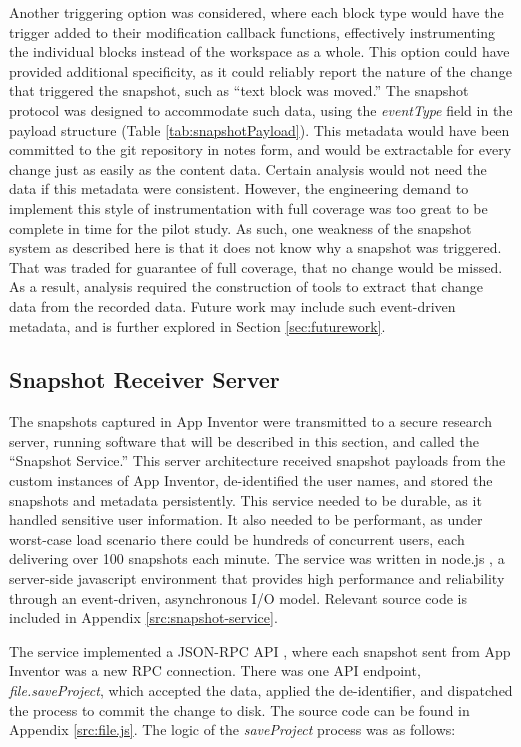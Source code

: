 Another triggering option was considered, where each block type would have the trigger added to their modification callback functions, effectively instrumenting the individual blocks instead of the workspace as a whole. This option could have provided additional specificity, as it could reliably report the nature of the change that triggered the snapshot, such as ``text block was moved.'' The snapshot protocol was designed to accommodate such data, using the \emph{eventType} field in the payload structure (Table \ref{tab:snapshotPayload}). This metadata would have been committed to the git repository in notes form, and would be extractable for every change just as easily as the content data. Certain analysis would not need the data if this metadata were consistent. However, the engineering demand to implement this style of instrumentation with full coverage was too great to be complete in time for the pilot study. As such, one weakness of the snapshot system as described here is that it does not know why a snapshot was triggered. That was traded for guarantee of full coverage, that no change would be missed. As a result, analysis required the construction of tools to extract that change data from the recorded data. Future work may include such event-driven metadata, and is further explored in Section \ref{sec:futurework}.

\subsection{Snapshot Receiver Server}
\label{sec:server}
The snapshots captured in App Inventor were transmitted to a secure research server, running software that will be described in this section, and called the ``Snapshot Service.'' This server architecture received snapshot payloads from the custom instances of App Inventor, de-identified the user names, and stored the snapshots and metadata persistently. This service needed to be durable, as it handled sensitive user information. It also needed to be performant, as under worst-case load scenario there could be hundreds of concurrent users, each delivering over 100 snapshots each minute. The service was written in node.js \citep{nodejs}, a server-side javascript environment that provides high performance and reliability through an event-driven, asynchronous I/O model. Relevant source code is included in Appendix \ref{src:snapshot-service}.

The service implemented a JSON-RPC API \citep{jsonrpc}, where each snapshot sent from App Inventor was a new RPC connection. There was one API endpoint, \emph{file.saveProject}, which accepted the data, applied the de-identifier, and dispatched the process to commit the change to disk. The source code can be found in Appendix \ref{src:file.js}. The logic of the \emph{saveProject} process was as follows:

